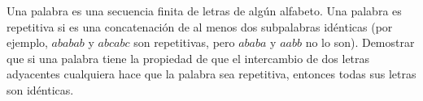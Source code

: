 Una palabra es una secuencia finita de letras de algún alfabeto. Una palabra es repetitiva si es una concatenación de al menos dos subpalabras idénticas (por ejemplo, $ababab$ y $abcabc$ son repetitivas, pero $ababa$ y $aabb$ no lo son). Demostrar que si una palabra tiene la propiedad de que el intercambio de dos letras adyacentes cualquiera hace que la palabra sea repetitiva, entonces todas sus letras son idénticas. 